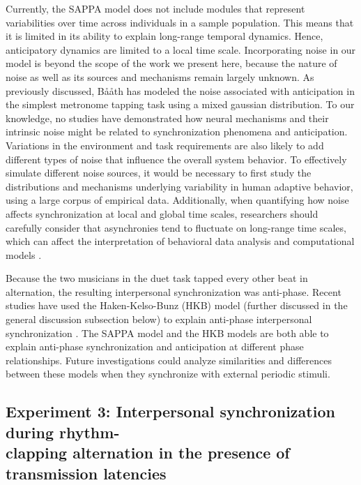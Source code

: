 \documentclass{report}
\begin{document}
Currently, the SAPPA model does not include modules that represent variabilities over time across individuals in a sample population. This means that it is limited in its ability to explain long-range temporal dynamics. Hence, anticipatory dynamics are limited to a local time scale. Incorporating noise in our model is beyond the scope of the work we present here, because the nature of noise as well as its sources and mechanisms remain largely unknown. As previously discussed, B\aa\aa th \cite{baaaath2016estimating} has modeled the noise associated with anticipation in the simplest metronome tapping task using a mixed gaussian distribution. To our knowledge, no studies have demonstrated how neural mechanisms and their intrinsic noise might be related to synchronization phenomena and anticipation. Variations in the environment and task requirements are also likely to add different types of noise that influence the overall system behavior. To effectively simulate different noise sources, it would be necessary to first study the distributions and mechanisms underlying variability in human adaptive behavior, using a large corpus of empirical data. Additionally, when quantifying how noise affects synchronization at local and global time scales, researchers should carefully consider that asynchronies tend to fluctuate on long-range time scales, which can affect the interpretation of behavioral data analysis and computational models \cite{torre2008distinct}.

Because the two musicians in the duet task tapped every other beat in alternation, the resulting interpersonal synchronization was anti-phase. Recent studies have used the Haken-Kelso-Bunz (HKB) model \cite{haken1985theoretical} (further discussed in the general discussion subsection below) to explain anti-phase interpersonal synchronization \cite{duarte2012interpersonal, dumas2014human, kelso2009virtual}. The SAPPA model and the HKB models are both able to explain anti-phase synchronization and anticipation at different phase relationships. Future investigations could analyze similarities and differences between these models when they synchronize with external periodic stimuli.

\subsection{Experiment 3: Interpersonal synchronization during rhythm-\\ clapping alternation in the presence of transmission latencies}
\end{document}
